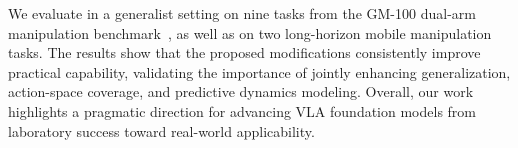 We evaluate \method in a generalist setting on nine tasks from the GM-100 dual-arm manipulation benchmark~\cite{gm100}, as well as on two long-horizon mobile manipulation tasks. The results show that the proposed modifications consistently improve practical capability, validating the importance of jointly enhancing generalization, action-space coverage, and predictive dynamics modeling. Overall, our work highlights a pragmatic direction for advancing VLA foundation models from laboratory success toward real-world applicability.
